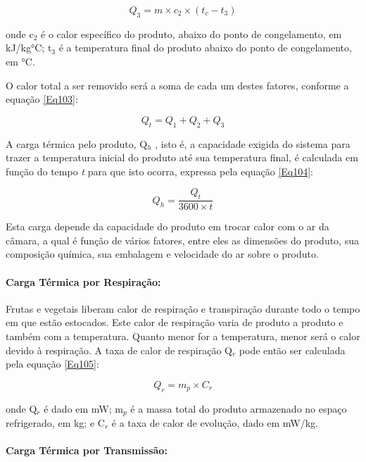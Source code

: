 \documentclass[10pt,a4paper]{article}
\begin{document}
\begin{equation} 
    Q_3 = m \times c_2 \times (t_c - t_3)
    \label{Eq102}
\end{equation}

onde c$_2$ é o calor específico do produto, abaixo do ponto de congelamento, em kJ/kg°C; t$_3$ é a temperatura final do produto abaixo do ponto de congelamento, em °C.

O calor total a ser removido será a soma de cada um destes fatores, conforme a equação \ref{Eq103}:

\begin{equation}
    Q_t = Q_1 + Q_2 + Q_3
    \label{Eq103}
\end{equation}

A carga térmica pelo produto, Q$_h$ , isto é, a capacidade exigida do sistema para trazer a temperatura inicial do produto até sua temperatura final, é calculada em função do tempo \textit{t} para que isto ocorra, expressa pela equação \ref{Eq104}:

\begin{equation}
    Q_h = \frac{Q_t}{3600 \times t}
    \label{Eq104}
\end{equation}

Esta carga depende da capacidade do produto em trocar calor com o ar da câmara, a qual é função de vários fatores, entre eles as dimensões do produto, sua composição química, sua embalagem e velocidade do ar sobre o produto.

\paragraph*{{ Carga Térmica por Respiração:}}

Frutas e vegetais liberam calor de respiração e transpiração durante todo o tempo em que estão estocados. Este calor de respiração varia de produto a produto e também com a temperatura. Quanto menor for a temperatura, menor será o
calor devido à respiração. A taxa de calor de respiração Q$_r$ pode então ser calculada pela equação \ref{Eq105}:

\begin{equation}
    Q_r = m_p \times C_r
    \label{Eq105}
\end{equation}

onde Q$_r$ é dado em mW; m$_p$ é a massa total do produto armazenado no espaço refrigerado, em kg; e C$_r$ é a taxa de calor de evolução, dado em mW/kg.

\paragraph*{{ Carga Térmica por Transmissão:}}
\end{document}
